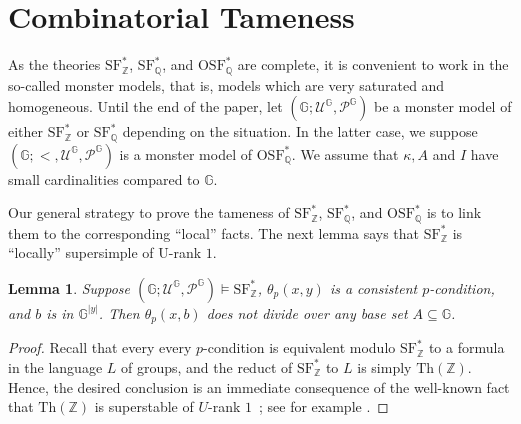 \documentclass[letterpaper]{amsart}
\newcommand{\qq}{\mathbb{Q}}
\newcommand{\zz}{\mathbb{Z}}
\renewcommand{\gg}{\mathbb{G}}
\newcommand{\sU}{\mathscr{U}}
\newcommand{\sP}{\mathscr{P}}
\newcommand{\TSFZ}{\mathrm{SF}^*_{\zz}}
\newcommand{\TSFQ}{\mathrm{SF}^*_{\qq}}
\newcommand{\TOSFQ}{\mathrm{OSF}^*_{\qq}}
\newtheorem{lem}[thm]{Lemma}
\begin{document}
\section{Combinatorial Tameness}

\noindent As the theories $\TSFZ$, $\TSFQ$, and $\TOSFQ$ are complete, it is convenient to work in the so-called monster models, that is, models which are very saturated and homogeneous. Until the end of the paper, let $(\gg; \sU^\gg, \sP^\gg)$ be a monster model of either  $\TSFZ$ or $\TSFQ$ depending on the situation. In the latter case, we suppose $(\gg; <, \sU^\gg, \sP^\gg)$ is a monster model of $\TOSFQ$. We assume that $\kappa, A$ and $I$ have
small cardinalities compared to $\gg$.

\medskip
\noindent Our general strategy to prove the tameness of $\TSFZ$, $\TSFQ$, and $\TOSFQ$ is to link them to the corresponding ``local'' facts. The next lemma  says that  $\TSFZ$ is ``locally'' supersimple of U-rank $1$.

\begin{lem}\label{localUrank1}
Suppose $(\gg; \sU^\gg, \sP^\gg) \models \TSFZ$, $\theta_p(x, y)$ is a consistent $p$-condition, and $b$ is in $\gg^{|y|}$. Then $\theta_p(x, b)$ does not divide over any base set $A\subseteq \gg$.
\end{lem}

\begin{proof}
Recall that every every $p$-condition is equivalent modulo $\TSFZ$ to a formula in the language $L$ of groups, and the reduct of $\TSFZ$ to $L$ is simply $\text{Th}(\zz)$. Hence, the desired conclusion is an immediate consequence of the well-known fact that $\text{Th}(\zz)$ is superstable of $U$-rank $1$~\cite{Qo}; see for example .
\begin{comment}
Suppose $(\gg; \sU^\gg, \sP^\gg)$, $\theta_p(x, b)$ are as stated, and $A$ is a small subset of $\gg$. Suppose $I$ is an infinite ordered set and  $(\sigma_i)_{i \in I}$ a family of $L^*_{\mathrm{u}}$-automorphisms of $(\gg; \sU^\gg, \sP^\gg)$  such that $(\sigma_i (b))_{i \in I}$ is indiscernible over $A$. By the monstrosity of $\gg$, the problem reduces to showing that the set $\{ \theta_p(x, \sigma_i (b)) : i \in I \}$ is consistent.
It is easy to see from Lemma \ref{basicpropertiesZ}(i, ii) that for some $l$, $\theta_p(x, b)$ defines a nonempty finite union of translations of $U^\gg_{p, l}$, which is a set definable over the empty-set.  Then $\theta_p(x, \sigma_i(b))$ defines the same set for all $i \in I$, and so $\bigcap_{i \in I} \theta_p(x, \sigma_i(b)) \neq \emptyset.$ The conclusion follows. 
\end{comment}
\end{proof}
\end{document}
